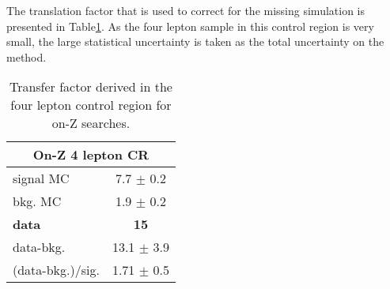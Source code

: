 The translation factor that is used to correct for the missing simulation is presented in Table\ref{tab:ZZonZ}.
As the four lepton sample in this control region is very small, the large statistical uncertainty is taken as the total uncertainty on the method.
\begin{table}[ht!]
\def\arraystretch{1.2}
\setlength{\belowcaptionskip}{6pt}
\small
\centering
\caption{Transfer factor derived in the four lepton control region for on-Z searches.}
\label{tab:ZZonZ}
\begin{tabular}{l c }
\hline \hline
\multicolumn{2}{c}{On-Z 4 lepton CR}  \\\hline
signal MC        & 7.7     $\pm$  0.2   \\
bkg. MC          & 1.9  $\pm$  0.2\\ \hline
\textbf{data}       & \textbf{15}  \\
data-bkg.        &  13.1   $\pm$  3.9 \\ \hline
(data-bkg.)/sig. & 1.71   $\pm$  0.5\\\hline\hline
\end{tabular}
\end{table}

